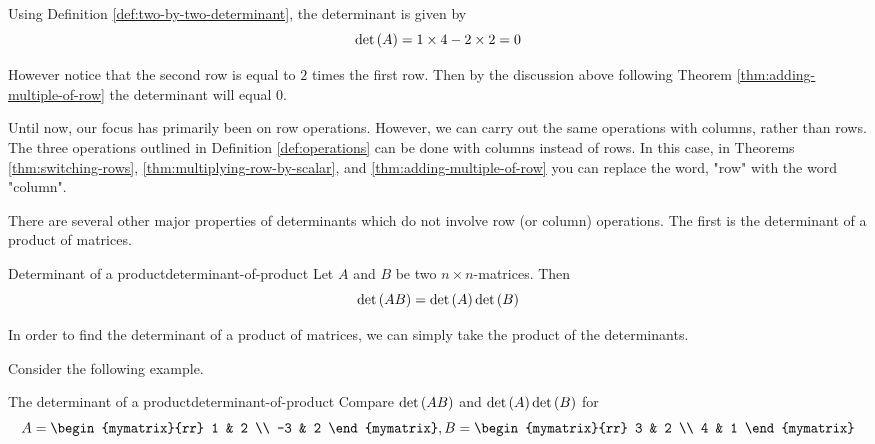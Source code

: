 \begin{solution}
Using Definition \ref{def:two-by-two-determinant}, the determinant is given by
\[
\det \left(A \right) = 1 \times 4 - 2 \times 2 = 0
\]

However notice that the second row is equal to $2$ times the first row. Then by the discussion above following Theorem \ref{thm:adding-multiple-of-row} the determinant will equal $0$.
\end{solution}

Until now, our focus has primarily been on row operations. However, we can carry out the 
same operations with columns, rather than rows. The three operations outlined in
Definition \ref{def:operations} can be done with columns instead of rows. 
In this case, in Theorems \ref{thm:switching-rows}, \ref{thm:multiplying-row-by-scalar}, 
and \ref{thm:adding-multiple-of-row} you can replace
the word, "row" with the word "column".

There are several other major properties of determinants which do not involve
row (or column) operations. The first is the determinant of a product of matrices. 

\begin{theorem}{Determinant of a product}{determinant-of-product}
Let $A$ and $B$ be two $n\times n$-matrices. Then
\begin{equation*}
\det \left(AB\right) =\det \left(A\right) \det \left(B\right)
\end{equation*}
\end{theorem}

In order to find the determinant of a product of matrices, we can simply take the product of the determinants. 

Consider the following example.

\begin{example}{The determinant of a product}{determinant-of-product}
Compare $\det \left(AB\right) $ and $\det \left(A\right) \det \left(
B\right) $ for
\begin{equation*}
A=\begin{mymatrix}{rr}
1 & 2 \\
-3 & 2
\end{mymatrix} ,B=\begin{mymatrix}{rr}
3 & 2 \\
4 & 1
\end{mymatrix} 
\end{equation*}
\end{example}

